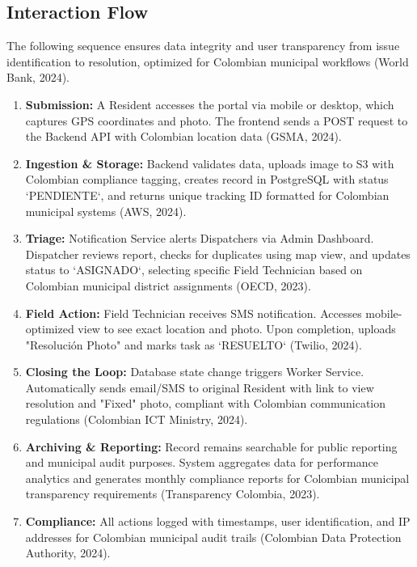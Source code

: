 \documentclass[12pt,a4paper]{article}
\begin{document}
\subsection{Interaction Flow}

The following sequence ensures data integrity and user transparency from issue identification to resolution, optimized for Colombian municipal workflows (World Bank, 2024).

\begin{enumerate}
    \item \textbf{Submission:} A Resident accesses the portal via mobile or desktop, which captures GPS coordinates and photo. The frontend sends a POST request to the Backend API with Colombian location data (GSMA, 2024).
    \item \textbf{Ingestion \& Storage:} Backend validates data, uploads image to S3 with Colombian compliance tagging, creates record in PostgreSQL with status `PENDIENTE`, and returns unique tracking ID formatted for Colombian municipal systems (AWS, 2024).
    \item \textbf{Triage:} Notification Service alerts Dispatchers via Admin Dashboard. Dispatcher reviews report, checks for duplicates using map view, and updates status to `ASIGNADO`, selecting specific Field Technician based on Colombian municipal district assignments (OECD, 2023).
    \item \textbf{Field Action:} Field Technician receives SMS notification. Accesses mobile-optimized view to see exact location and photo. Upon completion, uploads "Resolución Photo" and marks task as `RESUELTO` (Twilio, 2024).
    \item \textbf{Closing the Loop:} Database state change triggers Worker Service. Automatically sends email/SMS to original Resident with link to view resolution and "Fixed" photo, compliant with Colombian communication regulations (Colombian ICT Ministry, 2024).
    \item \textbf{Archiving \& Reporting:} Record remains searchable for public reporting and municipal audit purposes. System aggregates data for performance analytics and generates monthly compliance reports for Colombian municipal transparency requirements (Transparency Colombia, 2023).
    \item \textbf{Compliance:} All actions logged with timestamps, user identification, and IP addresses for Colombian municipal audit trails (Colombian Data Protection Authority, 2024).
\end{enumerate}
\end{document}

